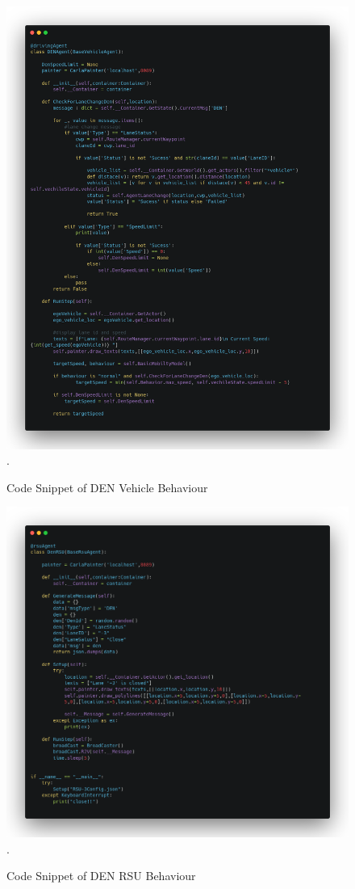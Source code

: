 \begin{figure}[h!]
    \centering
    \includegraphics[width=15cm]{Framework/Images/denV.png}.
    \caption{Code Snippet of DEN Vehicle Behaviour}
\end{figure}
\begin{figure}[h!]
    \centering
    \includegraphics[width=15cm]{Framework/Images/denRSU.png}.
    \caption{Code Snippet of DEN RSU Behaviour}
\end{figure}
